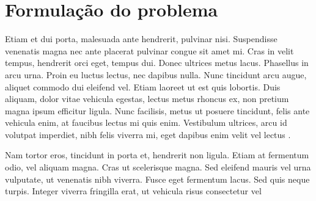 \section{Formulação do problema}

Etiam et dui porta, malesuada ante hendrerit, pulvinar nisi. Suspendisse venenatis magna nec ante placerat pulvinar congue sit amet mi. Cras in velit tempus, hendrerit orci eget, tempus dui. Donec ultrices metus lacus. Phasellus in arcu urna. Proin eu luctus lectus, nec dapibus nulla. Nunc tincidunt arcu augue, aliquet commodo dui eleifend vel. Etiam laoreet ut est quis lobortis. Duis aliquam, dolor vitae vehicula egestas, lectus metus rhoncus ex, non pretium magna ipsum efficitur ligula. Nunc facilisis, metus ut posuere tincidunt, felis ante vehicula enim, at faucibus lectus mi quis enim. Vestibulum ultrices, arcu id volutpat imperdiet, nibh felis viverra mi, eget dapibus enim velit vel lectus \cite{dummy2024article}.

Nam tortor eros, tincidunt in porta et, hendrerit non ligula. Etiam at fermentum odio, vel aliquam magna. Cras ut scelerisque magna. Sed eleifend mauris vel urna vulputate, ut venenatis nibh viverra. Fusce eget fermentum lacus. Sed quis neque turpis. Integer viverra fringilla erat, ut vehicula risus consectetur vel \cites{dummy2024article,dummy2024book}
